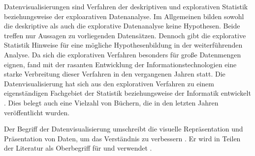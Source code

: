 %

Datenvisualisierungen sind Verfahren der deskriptiven und explorativen Statistik beziehungsweise der exploarativen Datenanalyse. 
Im Allgemeinen bilden sowohl die deskriptive als auch die explorative Datenanalyse keine Hypothesen. Beide treffen nur Aussagen zu vorliegenden Datensätzen. 
Dennoch gibt die explorative Statistik Hinweise für eine mögliche Hypothesenbildung in der weiterführenden Analyse. 
Da sich die explorativen Verfahren besonders für große Datenmengen eignen, fand mit der rasanten Entwicklung der Informationstechnologien 
eine starke Verbreitung dieser Verfahren in den vergangenen Jahren statt. Die Datenvisualisierung hat sich aus den explorativen Verfahren zu einem eigenständigen Fachgebiet der Statistik 
beziehungsweise der Informatik entwickelt \cite[vgl.][28 f.]{becker_stochastische_2016}. Dies belegt auch eine Vielzahl von Büchern, die in den letzten Jahren veröffentlicht wurden.


Der Begriff der Datenvisualisierung umschreibt die visuelle Repräsentation und Präsentation von Daten, um das Verständnis zu verbessern \cite[vgl.][15 ff.]{kirk_data_2019}.
Er wird in Teilen der Literatur als Oberbegriff für  und 
 verwendet \cite[vgl.][11]{few_now_2009}.


